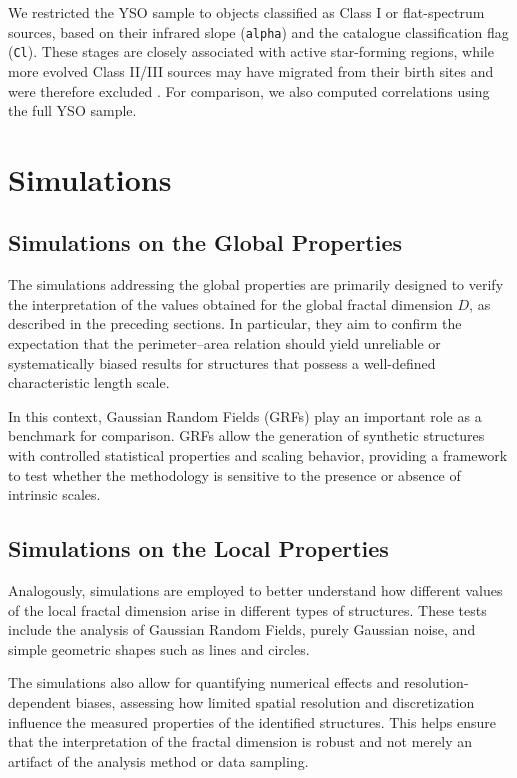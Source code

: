 We restricted the YSO sample to objects classified as Class I or flat-spectrum sources, based on their infrared slope (\texttt{alpha}) and the catalogue classification flag (\texttt{Cl}). These stages are closely associated with active star-forming regions, while more evolved Class II/III sources may have migrated from their birth sites and were therefore excluded \cite{lada1987star}. For comparison, we also computed correlations using the full YSO sample.

\section{Simulations}

\subsection{Simulations on the Global Properties}

The simulations addressing the global properties are primarily designed to verify the interpretation of the values obtained for the global fractal dimension $D$, as described in the preceding sections. In particular, they aim to confirm the expectation that the perimeter–area relation should yield unreliable or systematically biased results for structures that possess a well-defined characteristic length scale. 

In this context, Gaussian Random Fields (GRFs) play an important role as a benchmark for comparison. GRFs allow the generation of synthetic structures with controlled statistical properties and scaling behavior, providing a framework to test whether the methodology is sensitive to the presence or absence of intrinsic scales.

\subsection{Simulations on the Local Properties}

Analogously, simulations are employed to better understand how different values of the local fractal dimension arise in different types of structures. These tests include the analysis of Gaussian Random Fields, purely Gaussian noise, and simple geometric shapes such as lines and circles. 

The simulations also allow for quantifying numerical effects and resolution-dependent biases, assessing how limited spatial resolution and discretization influence the measured properties of the identified structures. This helps ensure that the interpretation of the fractal dimension is robust and not merely an artifact of the analysis method or data sampling.

